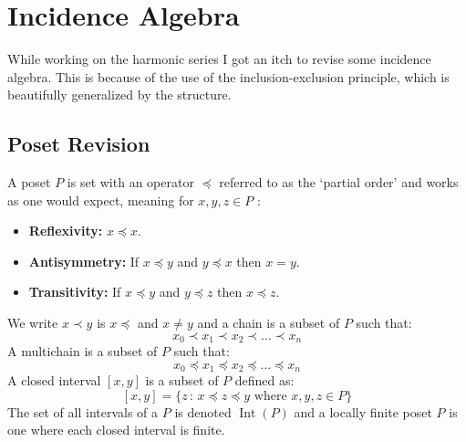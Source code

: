 
\section{Incidence Algebra}
While working on the harmonic series I got an itch to revise some incidence algebra.
This is because of the use of the inclusion-exclusion principle,
which is beautifully generalized by the structure. 

\subsection{Poset Revision}
A poset $P$ is set with an operator $\preceq$ referred to as the `partial order' and works as one would expect, meaning for $x,y,z\in P$ :
\begin{itemize}
	\item {\bf Reflexivity:}  $x\preceq x$.
	\item {\bf Antisymmetry:}  If $x\preceq y$ and $y\preceq x$ then $x=y$.
	\item {\bf Transitivity:}  If $x\preceq y$ and $y\preceq z$ then $x\preceq z$.
\end{itemize}
We write $x\prec y$ is $x\preceq$ and $x\neq y$ and a chain is a subset of $P$ such that:
\[x_0\prec x_1 \prec x_2 \prec \dots \prec x_n\]
A multichain is a subset of $P$ such that:
\[x_0\preceq x_1 \preceq x_2 \preceq \dots \preceq x_n\]
A closed interval $[x,y]$ is a subset of $P$ defined as:
\[[x,y] = \{z\,:\,x\preceq z\preceq y \text{ where }x,y,z\in P\}\]
The set of all intervals of a $P$ is denoted $\operatorname{Int}(P)$ and a locally finite poset $P$ is one where each closed interval is finite.

